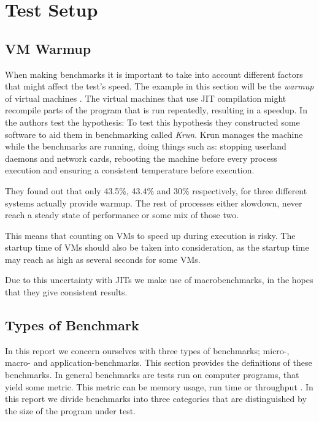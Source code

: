 \section{Test Setup}

\subsection{VM Warmup}\label{sec:sub:vmwarmup}
When making benchmarks it is important to take into account different factors that might affect the test's speed.
The example in this section will be the \textit{warmup} of virtual machines \cite{vmwarmup}.
The virtual machines that use \ac{JIT} compilation might recompile parts of the program that is run repeatedly, resulting in a speedup.
In \cite{vmwarmup} the authors test the hypothesis: 
To test this hypothesis they constructed some software to aid them in benchmarking called \textit{Krun}.
Krun manages the machine while the benchmarks are running, doing things such as: stopping userland daemons and network cards, rebooting the machine before every process execution and ensuring a consistent temperature before execution.

They found out that only 43.5\%, 43.4\% and 30\% respectively, for three different systems actually provide  warmup. The rest of processes either slowdown, never reach a steady state of performance or some mix of those two.

This means that counting on \acs{VM}s to speed up during execution is risky.
The startup time of \acs{VM}s should also be taken into consideration, as the startup time may reach as high as several seconds for some \acs{VM}s.

Due to this uncertainty with \acs{JIT}s we make use of macrobenchmarks, in the hopes that they give consistent results.

\subsection{Types of Benchmark}
In this report we concern ourselves with three types of benchmarks; micro-, macro- and application-benchmarks. This section provides the definitions of these benchmarks. In general benchmarks are tests run on computer programs, that yield some metric. This metric can be memory usage, run time or throughput \cite{Fleming:1986:LSC:5666.5673}. In this report we divide benchmarks into three categories that are distinguished by the size of the program under test.

